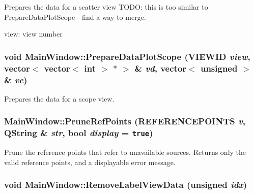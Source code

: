 Prepares the data for a scatter view TODO: this is too similar to PrepareDataPlotScope - find a way to merge. 

view: view number \hypertarget{class_main_window_2d0517d35ce319470221b8efe5848170}{
\subsubsection[{PrepareDataPlotScope}]{\setlength{\rightskip}{0pt plus 5cm}void MainWindow::PrepareDataPlotScope ({\bf VIEWID} {\em view}, \/  vector$<$ vector$<$ int $>$ $\ast$ $>$ \& {\em vd}, \/  vector$<$ unsigned $>$ \& {\em vc})}}
\label{class_main_window_2d0517d35ce319470221b8efe5848170}


Prepares the data for a scope view. 

\hypertarget{class_main_window_95232bc23cf06fa64b767677ac13530c}{
\subsubsection[{PruneRefPoints}]{ MainWindow::PruneRefPoints ({\bf REFERENCEPOINTS} {\em v}, \/  QString \& {\em str}, \/  bool {\em display} = {\tt true})}}
\label{class_main_window_95232bc23cf06fa64b767677ac13530c}


Prune the reference points that refer to unavailable sources. Returns only the valid reference points, and a displayable error message. 

\hypertarget{class_main_window_99b5eb2a43ee81015013815f4d316b43}{
\subsubsection[{RemoveLabelViewData}]{\setlength{\rightskip}{0pt plus 5cm}void MainWindow::RemoveLabelViewData (unsigned {\em idx})}}
\label{class_main_window_99b5eb2a43ee81015013815f4d316b43}


